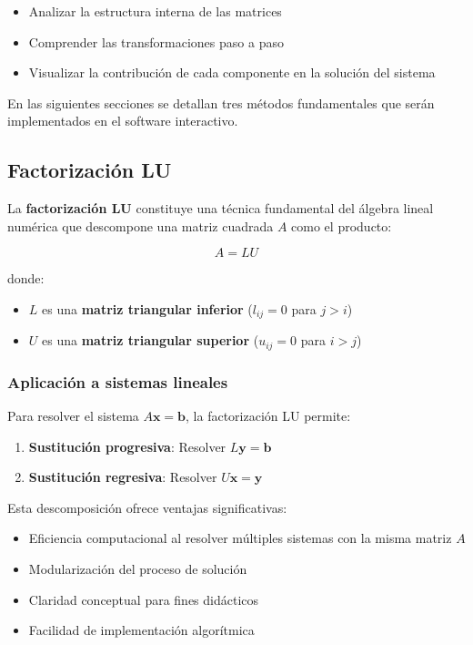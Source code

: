\begin{itemize}
	\item Analizar la estructura interna de las matrices
	\item Comprender las transformaciones paso a paso
	\item Visualizar la contribución de cada componente en la solución del sistema
\end{itemize}

En las siguientes secciones se detallan tres métodos fundamentales que serán implementados en el software interactivo.

\subsection{Factorización LU}

La \textbf{factorización LU} constituye una técnica fundamental del álgebra lineal numérica que descompone una matriz cuadrada $A$ como el producto:

\[
A = LU
\]

donde:
\begin{itemize}
	\item $L$ es una \textbf{matriz triangular inferior} ($l_{ij} = 0$ para $j > i$)
	\item $U$ es una \textbf{matriz triangular superior} ($u_{ij} = 0$ para $i > j$)
\end{itemize}

\subsubsection{Aplicación a sistemas lineales}

Para resolver el sistema $A\mathbf{x} = \mathbf{b}$, la factorización LU permite:

\begin{enumerate}
	\item \textbf{Sustitución progresiva}: Resolver $L\mathbf{y} = \mathbf{b}$
	\item \textbf{Sustitución regresiva}: Resolver $U\mathbf{x} = \mathbf{y}$
\end{enumerate}

Esta descomposición ofrece ventajas significativas:

\begin{itemize}
	\item Eficiencia computacional al resolver múltiples sistemas con la misma matriz $A$
	\item Modularización del proceso de solución
	\item Claridad conceptual para fines didácticos
	\item Facilidad de implementación algorítmica
\end{itemize}

